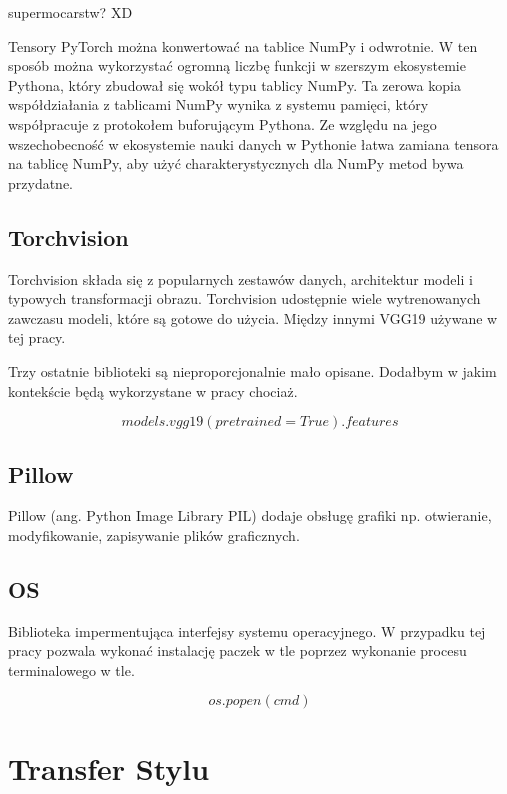 \documentclass[brudnopis]{xmgr}
\begin{document}
supermocarstw? XD


Tensory PyTorch można konwertować na tablice NumPy i odwrotnie. W ten sposób można wykorzystać ogromną liczbę funkcji w szerszym ekosystemie Pythona, który zbudował się wokół typu tablicy NumPy. Ta zerowa kopia współdziałania z tablicami NumPy wynika z systemu pamięci, który współpracuje z protokołem buforującym Pythona. 
Ze względu na jego wszechobecność w ekosystemie nauki danych w Pythonie łatwa zamiana tensora na tablicę NumPy, aby użyć charakterystycznych dla NumPy metod bywa przydatne.

    \section{Torchvision\label{s:dsssl}}
    
    Torchvision składa się z popularnych zestawów danych, architektur modeli i typowych transformacji obrazu. Torchvision udostępnie wiele wytrenowanych zawczasu modeli, które są gotowe do użycia. Między innymi VGG19 używane w tej pracy.
    
    Trzy ostatnie biblioteki są nieproporcjonalnie mało opisane. Dodałbym w jakim kontekście będą wykorzystane w pracy chociaż.

\begin{equation}
models.vgg19(pretrained=True).features
\end{equation}


    \section{Pillow\label{s:dsssl}}
    
   Pillow (ang. Python Image Library PIL) dodaje obsługę grafiki np. otwieranie, modyfikowanie, zapisywanie plików graficznych.
    
        \section{OS\label{s:dsssl}}
        
        Biblioteka impermentująca  interfejsy systemu operacyjnego. W przypadku tej pracy pozwala wykonać instalację paczek w tle poprzez wykonanie procesu terminalowego w tle. 

\begin{equation}
os.popen(cmd)
\end{equation}


\chapter{Transfer Stylu }
\end{document}
